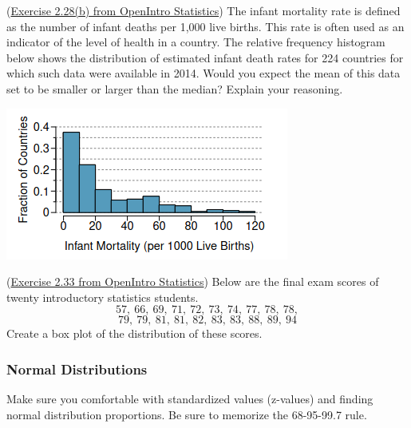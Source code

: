 \documentclass[12pt]{exam}
\newcounter{countA}
\begin{document}
\begin{questions}
\setcounter{question}{\value{countA}}

\question (\href{http://people.hsc.edu/faculty-staff/blins/books/OpenIntroStats4e.pdf\#eoce.2.28}{Exercise 2.28(b) from OpenIntro Statistics}) The infant mortality rate is defined as the number of infant deaths per 1{,}000 live
births. This rate is often used as an indicator of the level of health in a country. The relative frequency
histogram below shows the distribution of estimated infant death rates for 224 countries for which such data
were available in 2014. Would you expect the mean of this data set
to be smaller or larger than the median?
Explain your reasoning.
\begin{flushright}
\includegraphics[scale=0.6]{infantMortality.png}
\end{flushright}
\begin{solution}
\end{solution}
\bigskip

\question (\href{http://people.hsc.edu/faculty-staff/blins/books/OpenIntroStats4e.pdf\#eoce.2.33}{Exercise 2.33 from OpenIntro Statistics}) Below are the final exam scores of twenty introductory statistics students.
$$57,~66,~69,~71,~72,~73,~74,~77,~78,~78,$$
$$79,~79,~81,~81,~82,~83,~83,~88,~89,~94$$
Create a box plot of the distribution of these scores.
\vspace*{2.5in}

\setcounter{countA}{\value{question}}
\end{questions}

\subsubsection*{Normal Distributions}

Make sure you comfortable with standardized values (z-values) and finding normal distribution proportions. Be sure to memorize the 68-95-99.7 rule.
\end{document}
